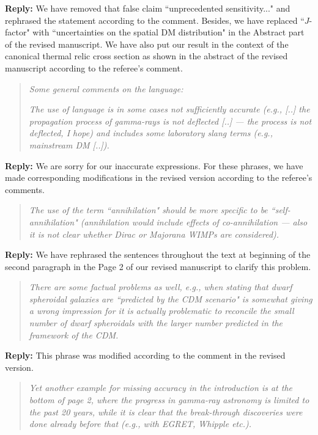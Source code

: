 \documentclass{article}
\begin{document}
\textbf{Reply:} We have removed that false claim ``unprecedented sensitivity..." and rephrased the statement according to the comment. Besides, we have replaced ``$J$-factor" with ``uncertainties on the spatial DM distribution" in the Abstract part of the revised manuscript. We have also put our result in the context of the canonical thermal relic cross section as shown in the abstract of the revised manuscript according to the referee's comment.

\begin{quote}
\emph{Some general comments on the language:}

\emph{The use of language is in some cases not sufficiently accurate (e.g., [..] the propagation process of gamma-rays is not deflected [..] --- the process is not deflected, I hope) and includes some laboratory slang terms (e.g., mainstream DM [..]). }
\end{quote}

\textbf{Reply:} We are sorry for our inaccurate expressions. For these phrases, we have made corresponding modifications in the revised version according to the referee's comments.

\begin{quote}
\emph{The use of the term ``annihilation" should be more specific to be ``self-annihilation" (annihilation would include effects of co-annihilation --- also it is not clear whether Dirac or Majorana WIMPs are considered).}
\end{quote}

\textbf{Reply:} We have rephrased the sentences throughout the text at beginning of the second paragraph in the Page 2 of our revised manuscript to clarify this problem.

\begin{quote}
\emph{There are some factual problems as well, e.g., when stating that dwarf spheroidal galaxies are ``predicted by the CDM scenario" is somewhat giving a wrong impression for it is actually problematic to reconcile the small number of dwarf spheroidals with the larger number predicted in the framework of the CDM.}
\end{quote}

\textbf{Reply:} This phrase was modified according to the comment in the revised version.

\begin{quote}
\emph{Yet another example for missing accuracy in the introduction is at the bottom of page 2, where the progress in gamma-ray astronomy is limited to the past 20 years, while it is clear that the break-through discoveries were done already before that (e.g., with EGRET, Whipple etc.).}
\end{quote}
\end{document}
